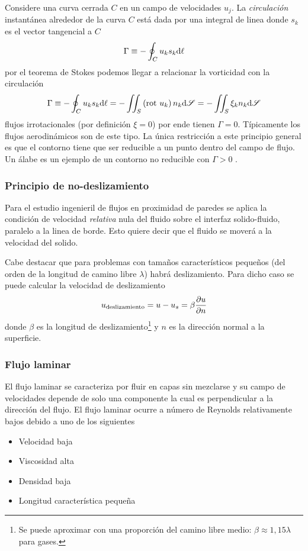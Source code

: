 Considere una curva cerrada $C$ en un campo de velocidades $u_j$. La \textit{circulación} instantánea alrededor de la curva $C$ está dada por una integral de linea donde $s_k$ es el vector tangencial a $C$
\begin{equation}
    \Gamma \equiv - \oint_C u_k s_k \textrm{d} \ell
\end{equation}
por el teorema de Stokes podemos llegar a relacionar la vorticidad con la circulación
\[
\Gamma \equiv - \oint_C u_k s_k \textrm{d} \ell = -\iint_S \left( \textrm{rot } u_k \right)n_k\textrm{d} \mathscr{S}= -\iint_S \xi_k n_k\textrm{d} \mathscr{S}
\]
flujos irrotacionales (por definición $\xi=0$) por ende tienen $\Gamma=0$. Típicamente los flujos aerodinámicos son de este tipo. La única restricción a este principio general es que el contorno tiene que ser reducible a un punto dentro del campo de flujo. Un álabe es un ejemplo de un contorno no reducible con $\Gamma>0$ \citep{durst2008fluid}.
\subsubsection{Principio de no-deslizamiento}
Para el estudio ingenieril de flujos en proximidad de paredes se aplica la condición de velocidad \textit{relativa} nula del fluido sobre el interfaz solido-fluido, paralelo a la linea de borde. Esto quiere decir que el fluido se moverá a la velocidad del solido.

Cabe destacar que para problemas con tamaños característicos pequeños (del orden de la longitud de camino libre $\lambda$) habrá deslizamiento. Para dicho caso se puede calcular la velocidad de deslizamiento
\[
u_{\textrm{deslizamiento}}=u-u_s=\beta \frac{\partial u}{\partial n}
\]
donde $\beta$ es la longitud de deslizamiento\footnote{Se puede aproximar con una proporción del camino libre medio: $\beta\approx 1,15\lambda$ para gases.} y $n$ es la dirección normal a la superficie.

\subsubsection{Flujo laminar}
El flujo laminar se caracteriza por fluir en capas sin mezclarse y su campo de velocidades depende de solo una componente la cual es perpendicular a la dirección del flujo. El flujo laminar ocurre a número de Reynolds relativamente bajos debido a uno de los siguientes
\begin{itemize}
    \item Velocidad baja
    \item Viscosidad alta
    \item Densidad baja
    \item Longitud característica pequeña
\end{itemize}

